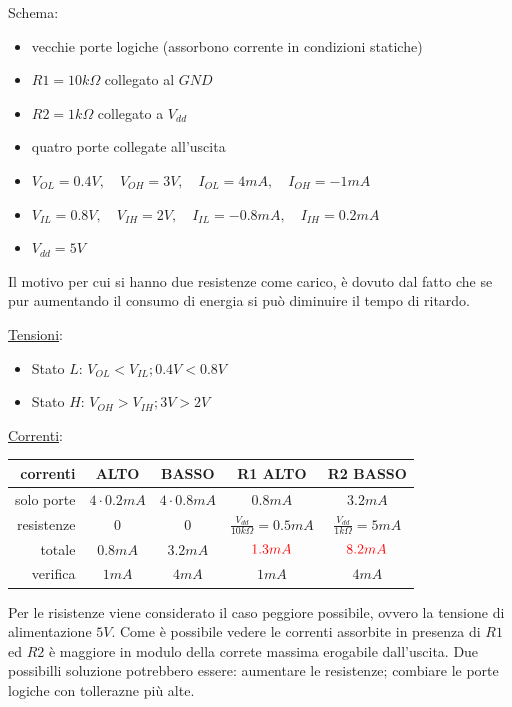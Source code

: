 \documentclass[12pt]{article}
\begin{document}
\begin{example}{}{}
    Schema:
    \begin{itemize}
        \item vecchie porte logiche (assorbono corrente in condizioni statiche)
        \item $R1=10k\Omega$ collegato al $GND$
        \item $R2=1k\Omega$ collegato a $V_{dd}$
        \item quatro porte collegate all'uscita
        \item $V_{OL}=0.4V,\quad V_{OH}=3V,\quad I_{OL}=4mA,\quad I_{OH}=-1mA$
        \item $V_{IL}=0.8V,\quad V_{IH}=2V,\quad I_{IL}=-0.8mA,\quad I_{IH}=0.2mA$
        \item $V_{dd} = 5V$
    \end{itemize}
    Il motivo per cui si hanno due resistenze come carico, \`e dovuto dal fatto che se pur aumentando il consumo di energia si pu\`o diminuire il tempo di ritardo.

    \underline{Tensioni}:
    \begin{itemize}
        \item Stato $L$: $V_{OL}<V_{IL}; 0.4V < 0.8V$
        \item Stato $H$: $V_{OH}>V_{IH}; 3V > 2V$
    \end{itemize}

    \underline{Correnti}:
    \begin{table}[H]
        \begin{center}
            \begin{tabular}{r|c|c|c|c}
            {\bf correnti} & ALTO & BASSO & R1 ALTO & R2 BASSO \\ \hline
            solo porte & $4 \cdot 0.2mA$ & $4 \cdot 0.8mA$ & $0.8mA$ & $3.2mA$ \\ \hline
            resistenze & $0$ & $0$ & $\frac{V_{dd}}{10k\Omega}=0.5mA$ & $\frac{V_{dd}}{1k\Omega}=5mA$ \\ \hline
            totale & $0.8mA$ & $3.2mA$ & ${\color{red}1.3mA}$ & ${\color{red}8.2mA}$ \\ \hline
            verifica & $1mA$ & $4mA$ & $1mA$ & $4mA$ \\ \hline
            \end{tabular}
        \end{center}
    \end{table}
    Per le risistenze viene considerato il caso peggiore possibile, ovvero la tensione di alimentazione $5V$. Come \`e possibile vedere le correnti assorbite in presenza di $R1$ ed $R2$ \`e maggiore in modulo della correte massima erogabile dall'uscita. Due possibilli soluzione potrebbero essere: aumentare le resistenze; combiare le porte logiche con tollerazne pi\`u alte.
\end{example}
\end{document}
